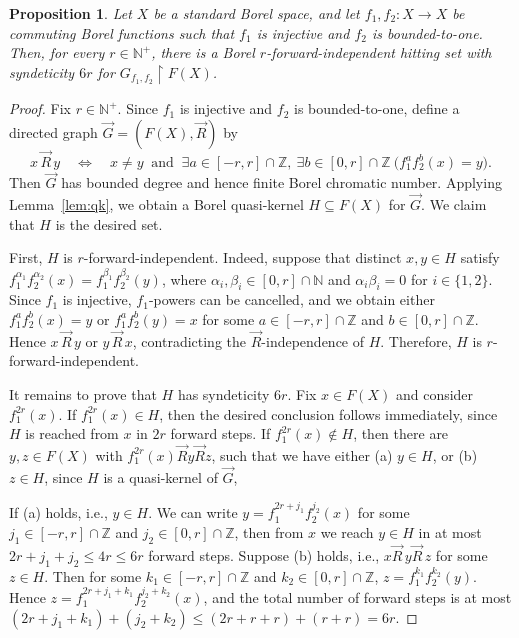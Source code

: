 \documentclass[11pt, reqno, a4paper]{amsart}
\newtheorem{proposition}[theorem]{Proposition}
\theoremstyle{definition}
\theoremstyle{plain}
\begin{document}
\begin{proposition}
\label{prop:specialcase}
Let $X$ be a standard Borel space, and let
$f_1,f_2:X\to X$ be commuting Borel functions such that $f_1$ is injective
and $f_2$ is bounded-to-one. Then, for every $r\in\mathbb N^+$, there is a
Borel $r$-forward-independent hitting set with syndeticity $6r$ for
$G_{f_1,f_2}\upharpoonright F(X)$.
\end{proposition}
\begin{proof}
Fix $r\in\mathbb N^+$. 
 Since $f_1$ is injective and $f_2$ is
bounded-to-one, define a directed graph $\vec G=(F(X),\vec R)$ by
$$
x\,\vec R\,y
\quad\Longleftrightarrow\quad
x\neq y
\ \text{ and }\
\exists a\in[-r,r]\cap \mathbb{Z},\ \exists b\in[0,r]\cap \mathbb{Z}\ 
\bigl(f_1^a f_2^b(x)=y\bigr).
$$
Then $\vec G$ has bounded degree and hence finite Borel chromatic
number. Applying Lemma~\ref{lem:qk},
we obtain a Borel quasi-kernel
$H\subseteq F(X)$
for $\vec G$. We claim that $H$ is the desired set.

First, $H$ is $r$-forward-independent. Indeed, suppose that distinct
$x,y\in H$ satisfy
$f_1^{\alpha_1}f_2^{\alpha_2}(x)
=
f_1^{\beta_1} f_2^{\beta_2}(y)$,
where
$\alpha_i, \beta_i \in [0,r]\cap \mathbb{N}$ and
$\alpha_i\beta_i=0$ for $i\in \{1,2\}$.
Since $f_1$ is injective, $f_1$-powers can be cancelled, and we obtain either
$f_1^a f_2^b(x)=y$ or
$f_1^a f_2^b(y)=x$
for some $a\in[-r,r]\cap \mathbb{Z}$ and $b\in[0,r]\cap \mathbb{Z}$. Hence $x\,\vec R\,y$ or
$y\,\vec R\,x$, contradicting the $\vec R$-independence of $H$.
Therefore, $H$ is $r$-forward-independent.

It remains to prove that $H$ has syndeticity $6r$. Fix
$x\in F(X)$ and consider $f_1^{2r}(x)$. If
$f_1^{2r}(x)\in H$, then the desired conclusion follows
immediately, since $H$ is reached from $x$ in $2r$ forward steps. If $f_1^{2r}(x)\notin H$, then there are $y,z\in F(X)$ with $f_1^{2r}(x)\vec R y\vec R z$, such that we have either (a) $y\in H$, or (b) 
$z\in H$,
since $H$ is a quasi-kernel of $\vec G$, 

If (a) holds, i.e., $y\in H$. We can write $y=f_1^{2r+j_1}f_2^{j_2}(x)$ for some $j_1\in [-r,r]\cap \mathbb{Z}$ and $j_2\in [0,r]\cap \mathbb{Z}$, then from $x$ we reach $y\in H$ in at most
$2r+j_1+j_2\le 4r\le 6r$
forward steps. Suppose (b) holds, i.e., $x\vec R\,y\vec R\,z$ for some $z\in H$. Then for some
$k_1\in[-r,r]\cap \mathbb{Z}$ and $k_2\in[0,r]\cap \mathbb{Z}$,
$z=f_1^{k_1} f_2^{k_2}(y)$.
Hence
$z=f_1^{2r+j_1+k_1} f_2^{j_2+k_2}(x)$, and the total
number of forward steps is at most
$(2r+j_1+k_1)+(j_2+k_2)
\le (2r+r+r)+(r+r)
=6r$. 
\end{proof}
\end{document}
